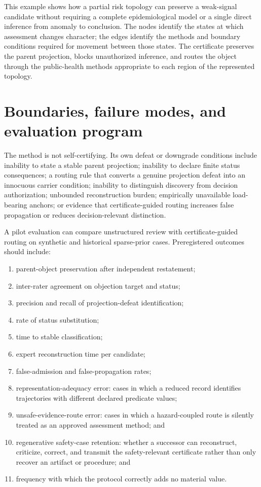 \documentclass[11pt]{article}
\begin{document}
This example shows how a partial risk topology can preserve a weak-signal candidate without requiring a complete epidemiological model or a single direct inference from anomaly to conclusion. The nodes identify the states at which assessment changes character; the edges identify the methods and boundary conditions required for movement between those states. The certificate preserves the parent projection, blocks unauthorized inference, and routes the object through the public-health methods appropriate to each region of the represented topology.

\section{Boundaries, failure modes, and evaluation program}
\label{sec:evaluation}

The method is not self-certifying. Its own defeat or downgrade conditions include inability to state a stable parent projection; inability to declare finite status consequences; a routing rule that converts a genuine projection defeat into an innocuous carrier condition; inability to distinguish discovery from decision authorization; unbounded reconstruction burden; empirically unavailable load-bearing anchors; or evidence that certificate-guided routing increases false propagation or reduces decision-relevant distinction.

A pilot evaluation can compare unstructured review with certificate-guided routing on synthetic and historical sparse-prior cases. Preregistered outcomes should include:
\begin{enumerate}[label=(\arabic*)]
\item parent-object preservation after independent restatement;
\item inter-rater agreement on objection target and status;
\item precision and recall of projection-defeat identification;
\item rate of status substitution;
\item time to stable classification;
\item expert reconstruction time per candidate;
\item false-admission and false-propagation rates;
\item representation-adequacy error: cases in which a reduced record identifies trajectories with different declared predicate values;
\item unsafe-evidence-route error: cases in which a hazard-coupled route is silently treated as an approved assessment method; and
\item regenerative safety-case retention: whether a successor can reconstruct, criticize, correct, and transmit the safety-relevant certificate rather than only recover an artifact or procedure; and
\item frequency with which the protocol correctly adds no material value.
\end{enumerate}
\end{document}
